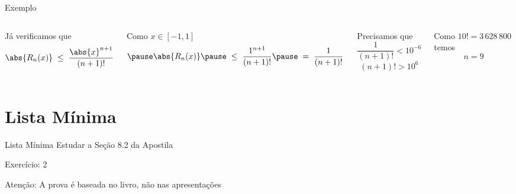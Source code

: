 \begin{frame}{Exemplo \theexemplo}
\begin{columns}
  Já verificamos que
  \[
    \abs{R_n(x)}
    \;\leq\; \frac{\abs{x}^{n+1}}{(n+1)!}
  \]

  \pause
  \vspace{\baselineskip}
  Como  \(x\in[-1, 1]\)
  \[
    \pause
    \abs{R_n(x)}
    \pause
    \;\leq\; \frac{1^{n+1}}{(n+1)!}
    \pause
    \;=\; \frac{1}{(n+1)!}
  \]

  \pause
  Precisamos que
  \[
    \frac{1}{(n+1)!} < 10^{-6}
  \]
  \[
    (n+1)! > 10^6
  \]

  \pause
  \vspace{\baselineskip}
  Como \(10! = 3\,628\,800\) temos
  \[
    n = 9
  \]
\end{columns}

\end{frame}

\section{Lista Mínima}

\begin{frame}{Lista Mínima}
  Estudar a Seção 8.2 da Apostila

  \vfill
  Exercício: 2

  \vfill
  Atenção: A prova é baseada no livro, não nas apresentações
\end{frame}


